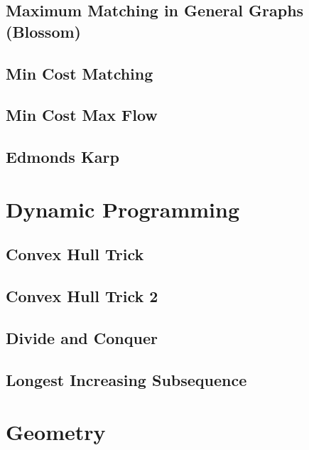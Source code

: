\subsection{Maximum Matching in General Graphs (Blossom)}
\raggedbottom
\hrulefill
\subsection{Min Cost Matching}
\raggedbottom
\hrulefill
\subsection{Min Cost Max Flow}
\raggedbottom
\hrulefill
\subsection{Edmonds Karp}
\raggedbottom
\hrulefill

\section{Dynamic Programming}
\subsection{Convex Hull Trick}
\raggedbottom
\hrulefill
\subsection{Convex Hull Trick 2}
\raggedbottom
\hrulefill
\subsection{Divide and Conquer}
\raggedbottom
\hrulefill
\subsection{Longest Increasing Subsequence}
\raggedbottom
\hrulefill

\section{Geometry}
